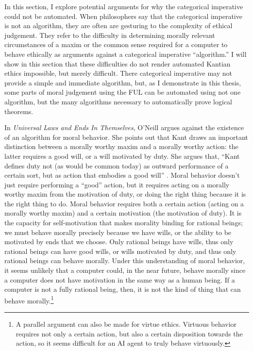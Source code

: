 \begin{isabellebody}
\begin{isamarkuptext}
In this section, I explore potential arguments for why the categorical imperative could not be automated. When 
philosophers say that the categorical imperative is not an algorithm, they are often are gesturing to the complexity
of ethical judgement. They refer to the difficulty in determining morally relevant circumstances of a maxim or the common 
sense required for a computer to behave ethically as arguments against a categorical imperative ``algorithm.'' 
I will show in this section that these difficulties do not render automated Kantian ethics impossible, but 
merely difficult. There categorical imperative may not provide a simple and immediate algorithm, but, as
I demonstrate in this thesis, some parts of moral judgement using the FUL can be automated using not one
algorithm, but the many algorithms necessary to automatically prove logical theorems.

In \emph{Universal Laws and Ends In Themselves}, O'Neill argues against the existence of an algorithm for
moral behavior. She points out that Kant draws an important distinction between a morally worthy maxim
and a morally worthy action: the latter requires a good will, or a will motivated by duty. She argues that, 
``Kant defines duty not (as would be common today) as outward performance of a certain sort, but as action
that embodies a good will'' \citep[345]{oneilluniversallaws}. Moral behavior doesn't just require performing
a ``good'' action, but it requires acting on a morally worthy maxim from the motivation of duty, or 
doing the right thing because it is the right thing to do. Moral behavior requires both a certain action 
(acting on a morally worthy maxim) and a certain motivation (the motivation of duty). It is the capacity 
for self-motivation that makes morality binding for rational beings; we must behave morally precisely 
because we have wills, or the ability to be motivated by ends
that we choose. Only rational beings have wills, thus only rational beings can have good wills, or wills
motivated by duty, and thus only rational beings can behave morally. Under this understanding
of moral behavior, it seems unlikely that a computer could, in the near future, behave morally
since a computer does not have motivation in the same way as a human being. If a computer is not a fully rational
being, then, it is not the kind of thing that can behave morally.\footnote{A parallel argument can also be made for virtue ethics. Virtuous
behavior requires not only a certain action, but also a certain disposition towards the action, so it seems
difficult for an AI agent to truly behave virtuously.}


\end{isamarkuptext}
\end{isabellebody}
